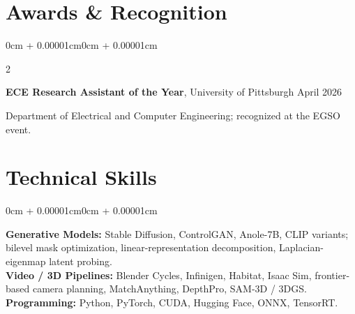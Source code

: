 \documentclass[10pt, letterpaper]{article}
\newenvironment{onecolentry}{
    \begin{adjustwidth}{0cm + 0.00001cm}{0cm + 0.00001cm}
}{\end{adjustwidth}}
\newenvironment{twocolentry}[2][]{
    \onecolentry
    \def\secondColumn{#2}
    \setcolumnwidth{\fill, 4.5cm}
    \begin{paracol}{2}
}{\switchcolumn \raggedleft \secondColumn \end{paracol} \endonecolentry}
\begin{document}
\section{Awards \& Recognition}

\begin{twocolentry}{April 2026}
    \textbf{ECE Research Assistant of the Year}, University of Pittsburgh
\end{twocolentry}
\vspace{0.04cm}
{\small Department of Electrical and Computer Engineering; recognized at the EGSO event.}

\section{Technical Skills}
\begin{onecolentry}
\textbf{Generative Models:} Stable Diffusion, ControlGAN, Anole-7B, CLIP variants; bilevel mask optimization, linear-representation decomposition, Laplacian-eigenmap latent probing.\\[2pt]
\textbf{Video / 3D Pipelines:} Blender Cycles, Infinigen, Habitat, Isaac Sim, frontier-based camera planning, MatchAnything, DepthPro, SAM-3D / 3DGS.\\[2pt]
\textbf{Programming:} Python, PyTorch, CUDA, Hugging Face, ONNX, TensorRT.
\end{onecolentry}
\end{document}
